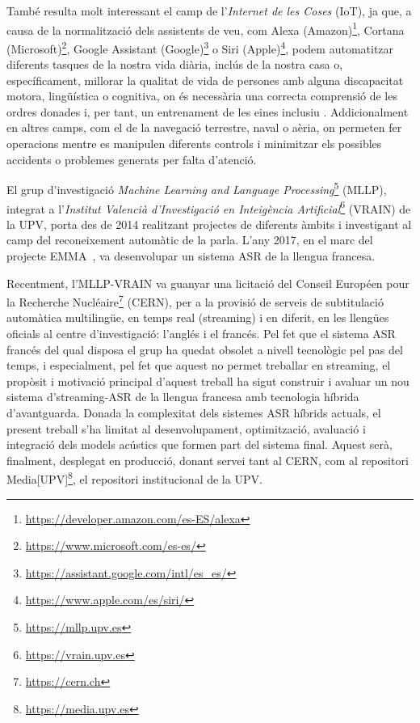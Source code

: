 També resulta molt interessant el camp de l'\textit{Internet de les Coses} (IoT), ja que, a causa de la normalització dels assistents de veu, com Alexa (Amazon)\footnote{\url{https://developer.amazon.com/es-ES/alexa}}, Cortana (Microsoft)\footnote{\url{https://www.microsoft.com/es-es/}}, Google Assistant (Google)\footnote{\url{https://assistant.google.com/intl/es_es/}} o Siri (Apple)\footnote{\url{https://www.apple.com/es/siri/}}, podem automatitzar diferents tasques de la nostra vida diària, inclús de la nostra casa o, específicament, millorar la qualitat de vida de persones amb alguna discapacitat motora, lingüística o cognitiva, on és necessària una correcta comprensió de les ordres donades i, per tant, un entrenament de les eines inclusiu \cite{masina2020accesibility}.
Addicionalment en altres camps, com el de la navegació terrestre, naval o aèria, on permeten fer operacions mentre es manipulen diferents controls i minimitzar els possibles accidents o problemes generats per falta d'atenció.



El grup d'investigació \textit{Machine Learning and Language Processing}\footnote{\href{https://mllp.upv.es}{https://mllp.upv.es}} (MLLP), integrat a l'\textit{Institut Valencià d'Investigació en Inte\lgem igència Artificial}\footnote{\href{https://vrain.upv.es}{https://vrain.upv.es}} (VRAIN) de la UPV, porta des de 2014 realitzant projectes de diferents àmbits i investigant al camp del reconeixement automàtic de la parla.
L'any 2017, en el marc del projecte EMMA~\cite{emma_project}, va desenvolupar un sistema ASR de la llengua francesa. 


Recentment, l'MLLP-VRAIN va guanyar una licitació del Conseil Européen pour la Recherche Nucléaire\footnote{\href{https://cern.ch}{https://cern.ch}} (CERN), per a la provisió de serveis de subtitulació automàtica multilingüe, en temps real (streaming) i en diferit, en les llengües oficials al centre d'investigació: l'anglés i el francés. 
Pel fet que el sistema ASR francés del qual disposa el grup ha quedat obsolet a nivell tecnològic pel pas del temps, i especialment, pel fet que aquest no permet treballar en streaming, el propòsit i motivació principal d'aquest treball ha sigut construir i avaluar un nou sistema d'streaming-ASR de la llengua francesa amb tecnologia híbrida d'avantguarda. 
Donada la complexitat dels sistemes ASR híbrids actuals, el present treball s'ha limitat al desenvolupament, optimització, avaluació i integració dels models acústics que formen part del sistema final.
Aquest serà, finalment, desplegat en producció, donant servei tant al CERN, com al repositori Media[UPV]\footnote{\href{https://media.upv.es}{https://media.upv.es}}, el repositori institucional de la UPV.


